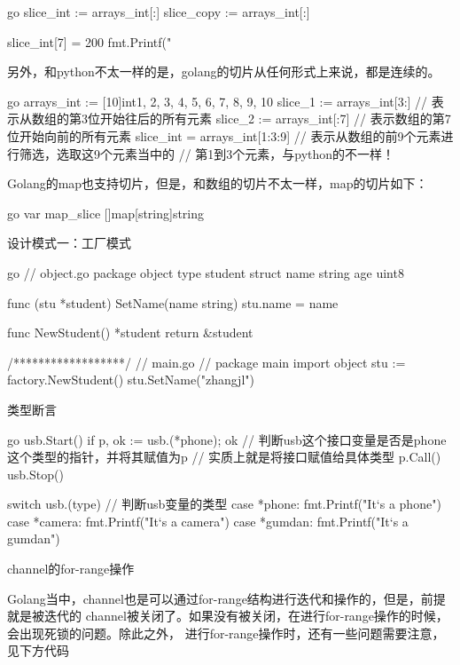 \begin{outline}[enumerate]
\begin{code-in-enumerate}{go}
slice_int := arrays_int[:]
slice_copy := arrays_int[:]

slice_int[7] = 200
fmt.Printf("%
\end{code-in-enumerate}

  另外，和python不太一样的是，golang的切片从任何形式上来说，都是连续的。
\begin{code-in-enumerate}{go}
arrays_int := [10]int{1, 2, 3, 4, 5, 6, 7, 8, 9, 10}
slice_1 := arrays_int[3:] // 表示从数组的第3位开始往后的所有元素
slice_2 := arrays_int[:7] // 表示数组的第7位开始向前的所有元素
slice_int = arrays_int[1:3:9] // 表示从数组的前9个元素进行筛选，选取这9个元素当中的
                              // 第1到3个元素，与python的不一样！
\end{code-in-enumerate}

  Golang的map也支持切片，但是，和数组的切片不太一样，map的切片如下：
\begin{code-in-enumerate}{go}
var map_slice []map[string]string
\end{code-in-enumerate}

  \1 设计模式一：工厂模式

\begin{code-in-enumerate}{go}
// object.go
package object
type student struct {
    name string
    age  uint8
}

func (stu *student) SetName(name string) {
    stu.name = name
}

func NewStudent() *student {
    return &student{}
}

/******************/
// main.go
// package main
import object
stu := factory.NewStudent()
stu.SetName("zhangjl")
\end{code-in-enumerate}

  \1 类型断言

\begin{code-in-enumerate}{go}
usb.Start()
if p, ok := usb.(*phone); ok { // 判断usb这个接口变量是否是phone这个类型的指针，并将其赋值为p
                               // 实质上就是将接口赋值给具体类型
    p.Call()
}
usb.Stop()

switch usb.(type) { // 判断usb变量的类型
case *phone:
    fmt.Printf("It`s a phone\n")
case *camera:
    fmt.Printf("It`s a camera\n")
case *gumdan:
    fmt.Printf("It`s a gumdan\n")
}
\end{code-in-enumerate}

  \1 channel的for-range操作

  Golang当中，channel也是可以通过for-range结构进行迭代和操作的，但是，前提就是被迭代的
  channel被关闭了。如果没有被关闭，在进行for-range操作的时候，会出现死锁的问题。除此之外，
  进行for-range操作时，还有一些问题需要注意，见下方代码


\end{outline}
